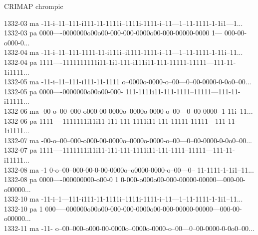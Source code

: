 \documentclass[12pt,t]{beamer}
\begin{document}
\begin{frame}[c]{CRIMAP chrompic}

\begin{center}

{\fontsize{6.9pt}{7.6}\selectfont \tt

1332-03 ma {\color{purple} -11-i--11--111-i111-11-1111i--1111i-1111-i--11---1--11-1111-1-1i1---1}... \\
1332-03 pa {\color{green} 0000----0000000o00o00-000-000-0000o00-000-00000-0000}{\color{purple} 1}---{\color{green} 000-00-o000-0}... \\[6pt]
1332-04 ma {\color{purple} -11-i--11--111-1111-11-i111i--i1111-1111-i--11---1--11-1111-1-11i--11}... \\
1332-04 pa {\color{purple} 1111----1111111111i11-1i1-111-i111i11-111-11111-11111---111-11-1i1111}... \\[6pt]
1332-05 ma {\color{purple} -11-i--11--111-i111-11-1111}{\color{green} o--0000o-0000-o--00---0--00-0000-0-0o0--00}... \\
1332-05 pa {\color{green} 0000----0000000o00o00-000}-{\color{purple} 111-1111i11-111-1111--11111---111-11-i11111}... \\[6pt]
1332-06 ma {\color{green} -00-o--00--000-o000-00-0000o--0000o-0000-o--00---0--00-0000}-{\color{purple} 1-11i--11}... \\
1332-06 pa {\color{purple} 1111----1111111i11i11-111-111-1111i11-111-11111-11111---111-11-1i1111}... \\[6pt]
1332-07 ma {\color{green} -00-o--00--000-o000-00-0000o--0000o-0000-o--00---0--00-0000-0-0o0--00}... \\
1332-07 pa {\color{purple} 1111----1111111i11i11-111-111-1111i11-111-1111--11111---111-11-i11111}... \\[6pt]
1332-08 ma {\color{purple} -1}{\color{green} 0-o--00--000-00-0-00-0000o--o0000-0000-o--00---0}--{\color{purple} 11-1111-1-1i1--11}... \\
1332-08 pa {\color{green} 0000----000000000-o00-0}{\color{purple} 1}{\color{green} 0-000-o000o00-000-00000-00000---000-00-o00000}... \\[6pt]
1332-10 ma {\color{purple} -11-i--1---111-i111-11-1111i--1111i-1111-i--11---1--11-1111-1-1i1--11}... \\
1332-10 pa {\color{purple} 1}{\color{green} 000-----000000o00o00-000-000-0000o00-000-00000-00000---000-00-o00000}... \\[6pt]
1332-11 ma {\color{purple} -11}-{\color{green} o--00--000-o000-00-0000o--0000o-0000-o--00---0--00-0000-0-0o0--00}... \\
}
\end{center}
\end{frame}
\end{document}
